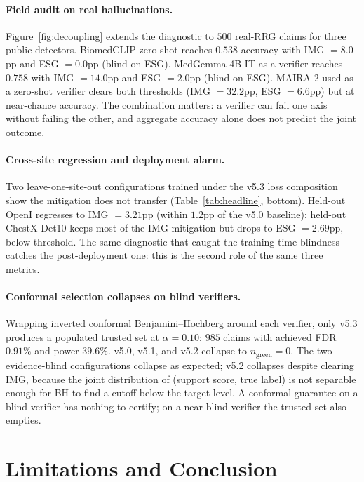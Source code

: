 \documentclass[10pt,twocolumn,letterpaper]{article}
\begin{document}
\paragraph{Field audit on real hallucinations.} Figure~\ref{fig:decoupling} extends the diagnostic to $500$ real-RRG claims for three public detectors. BiomedCLIP zero-shot reaches $0.538$ accuracy with IMG $=8.0$pp and ESG $=0.0$pp (blind on ESG). MedGemma-4B-IT as a verifier reaches $0.758$ with IMG $=14.0$pp and ESG $=2.0$pp (blind on ESG). MAIRA-2 used as a zero-shot verifier clears both thresholds (IMG $=32.2$pp, ESG $=6.6$pp) but at near-chance accuracy. The combination matters: a verifier can fail one axis without failing the other, and aggregate accuracy alone does not predict the joint outcome.

\paragraph{Cross-site regression and deployment alarm.} Two leave-one-site-out configurations trained under the v5.3 loss composition show the mitigation does not transfer (Table~\ref{tab:headline}, bottom). Held-out OpenI regresses to IMG $=3.21$pp (within $1.2$pp of the v5.0 baseline); held-out ChestX-Det10 keeps most of the IMG mitigation but drops to ESG $=2.69$pp, below threshold. The same diagnostic that caught the training-time blindness catches the post-deployment one: this is the second role of the same three metrics.

\paragraph{Conformal selection collapses on blind verifiers.} Wrapping inverted conformal Benjamini--Hochberg around each verifier, only v5.3 produces a populated trusted set at $\alpha = 0.10$: $985$ claims with achieved FDR $0.91\%$ and power $39.6\%$. v5.0, v5.1, and v5.2 collapse to $n_{\text{green}}=0$. The two evidence-blind configurations collapse as expected; v5.2 collapses despite clearing IMG, because the joint distribution of (support score, true label) is not separable enough for BH to find a cutoff below the target level. A conformal guarantee on a blind verifier has nothing to certify; on a near-blind verifier the trusted set also empties.

\section{Limitations and Conclusion}
\end{document}
